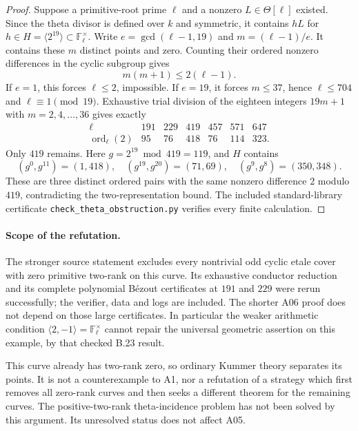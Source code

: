 \documentclass[11pt,a4paper]{article}
\begin{document}
\begin{proof}
Suppose a primitive-root prime $\ell$ and a nonzero
$L\in\Theta[\ell]$ existed. Since the theta divisor is defined over
$k$ and symmetric, it contains $hL$ for
$h\in H=\langle2^{19}\rangle\subset\mathbb F_\ell^\times$.
Write $e=\gcd(\ell-1,19)$ and $m=(\ell-1)/e$.
It contains these $m$ distinct points and zero. Counting their
ordered nonzero differences in the cyclic subgroup gives
\[
 m(m+1)\le2(\ell-1). \tag{A06.2}
\]
If $e=1$, this forces $\ell\le2$, impossible. If $e=19$,
it forces $m\le37$, hence $\ell\le704$ and
$\ell\equiv1\pmod{19}$. Exhaustive trial division of the eighteen
integers $19m+1$ with $m=2,4,\ldots,36$ gives exactly
\[
\begin{array}{c|rrrrrr}
 \ell&191&229&419&457&571&647\\ \hline
 \operatorname{ord}_\ell(2)&95&76&418&76&114&323.
\end{array}
\]
Only $419$ remains. Here $g=2^{19}\bmod419=119$, and $H$ contains
\[
 (g^0,g^{11})=(1,418),\quad
 (g^{19},g^{20})=(71,69),\quad
 (g^9,g^8)=(350,348).
\]
These are three distinct ordered pairs with the same nonzero
difference $2$ modulo $419$, contradicting the two-representation
bound. The included standard-library certificate
\texttt{check\_theta\_obstruction.py} verifies every finite calculation.
\end{proof}

\paragraph{Scope of the refutation.}
The stronger source statement \cite[B.23]{A1run} excludes every
nontrivial odd cyclic etale cover with zero primitive two-rank on this
curve. Its exhaustive conductor reduction and its complete polynomial
B\'ezout certificates at $191$ and $229$ were rerun successfully;
the verifier, data and logs are included. The shorter A06 proof does
not depend on those large certificates. In particular the weaker
arithmetic condition $\langle2,-1\rangle=\mathbb F_\ell^\times$
cannot repair the universal geometric assertion on this example,
by that checked B.23 result.

This curve already has two-rank zero, so ordinary Kummer theory
separates its points. It is not a counterexample to A1, nor a
refutation of a strategy which first removes all zero-rank curves
and then seeks a different theorem for the remaining curves.
The positive-two-rank theta-incidence problem has not been solved
by this argument. Its unresolved status does not affect A05.
\end{document}
